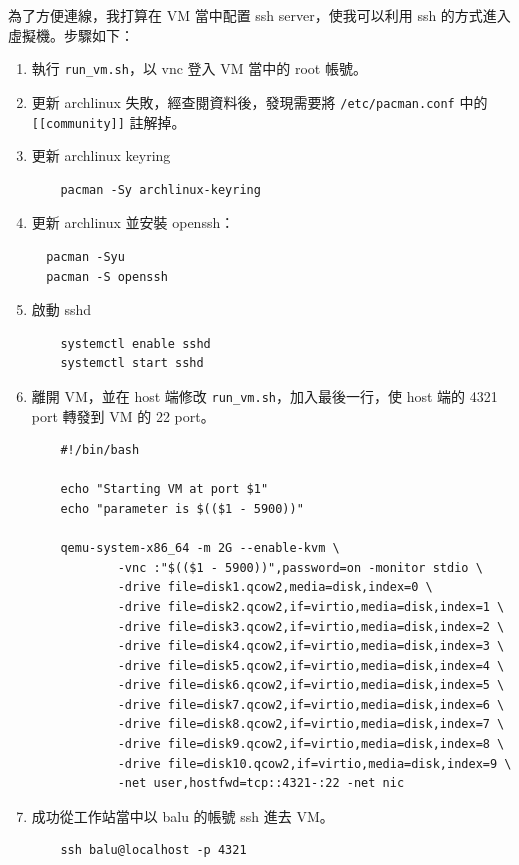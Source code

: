 \documentclass[12pt]{article}
\begin{document}
為了方便連線，我打算在 VM 當中配置 ssh server，使我可以利用 ssh 的方式進入虛擬機。步驟如下：

\begin{enumerate}
  \item 執行 \texttt{run\_vm.sh}，以 vnc 登入 VM 當中的 root 帳號。
  \item 更新 archlinux 失敗，經查閱資料後，發現需要將 \texttt{/etc/pacman.conf} 中的 \texttt{[[community]]} 註解掉。
  \item 更新 archlinux keyring
  \begin{verbatim}
    pacman -Sy archlinux-keyring
  \end{verbatim}
  \item 更新 archlinux 並安裝 openssh：
  \begin{verbatim}
  pacman -Syu
  pacman -S openssh
  \end{verbatim}
  \item 啟動 sshd
  \begin{verbatim}
    systemctl enable sshd
    systemctl start sshd
  \end{verbatim}
  \item 離開 VM，並在 host 端修改 \texttt{run\_vm.sh}，加入最後一行，使 host 端的 4321 port 轉發到 VM 的 22 port。
  \begin{verbatim}
    #!/bin/bash

    echo "Starting VM at port $1"
    echo "parameter is $(($1 - 5900))"

    qemu-system-x86_64 -m 2G --enable-kvm \
            -vnc :"$(($1 - 5900))",password=on -monitor stdio \
            -drive file=disk1.qcow2,media=disk,index=0 \
            -drive file=disk2.qcow2,if=virtio,media=disk,index=1 \
            -drive file=disk3.qcow2,if=virtio,media=disk,index=2 \
            -drive file=disk4.qcow2,if=virtio,media=disk,index=3 \
            -drive file=disk5.qcow2,if=virtio,media=disk,index=4 \
            -drive file=disk6.qcow2,if=virtio,media=disk,index=5 \
            -drive file=disk7.qcow2,if=virtio,media=disk,index=6 \
            -drive file=disk8.qcow2,if=virtio,media=disk,index=7 \
            -drive file=disk9.qcow2,if=virtio,media=disk,index=8 \
            -drive file=disk10.qcow2,if=virtio,media=disk,index=9 \
            -net user,hostfwd=tcp::4321-:22 -net nic
  \end{verbatim}
  \item 成功從工作站當中以 balu 的帳號 ssh 進去 VM。
  \begin{verbatim}
    ssh balu@localhost -p 4321
  \end{verbatim}
\end{enumerate}
\end{document}
